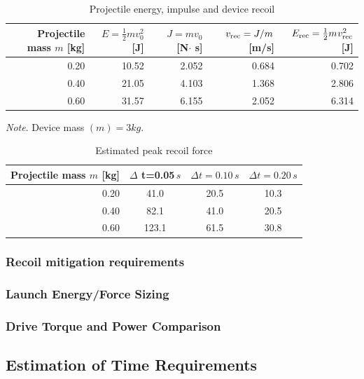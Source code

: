 \documentclass[a4paper,10pt]{article}
\begin{document}
\begin{table}[ht]
\centering
\caption{Projectile energy, impulse and device recoil}
\label{tab:proj_energy_recoil}
\begin{tabular}{@{}rrrrr@{}}
\toprule
Projectile mass $m$ [kg] & $E=\tfrac12 m v_0^2$ [J] & $J=m v_0$ [N$\cdot$ s] & {$v_{\rm rec}=J/m_{\rm}$ [m/s]} & $E_{\rm rec}=\tfrac12 m_{\rm} v_{\rm rec}^2$ [J] \\
\midrule
0.20 & 10.52 & 2.052 & 0.684 & 0.702 \\
0.40 & 21.05 & 4.103 & 1.368 & 2.806 \\
0.60 & 31.57 & 6.155 & 2.052 & 6.314 \\
\bottomrule
\end{tabular}
\begin{tablenotes}[flushleft]
\footnotesize
\textit{Note}. Device mass $(m) = 3kg$.
\end{tablenotes}
\end{table}

\begin{table}[ht]
\centering
\caption{Estimated peak recoil force}
\label{tab:recoil_forces}
\begin{tabular}{@{}rccc@{}}
\toprule
Projectile mass $m$ [kg] & $\Delta$ t=0.05\,$s$ & $\Delta t=0.10$\,$s$ & $\Delta t=0.20$\,$s$ \\
\midrule
0.20 & 41.0 & 20.5 & 10.3 \\
0.40 & 82.1 & 41.0 & 20.5 \\
0.60 & 123.1 & 61.5 & 30.8 \\
\bottomrule
\end{tabular}
\end{table}




\subsubsection{Recoil mitigation requirements}


\newpage

\subsubsection{Launch Energy/Force Sizing}

\subsubsection{Drive Torque and Power Comparison}

\subsection{Estimation of Time Requirements}
\end{document}
